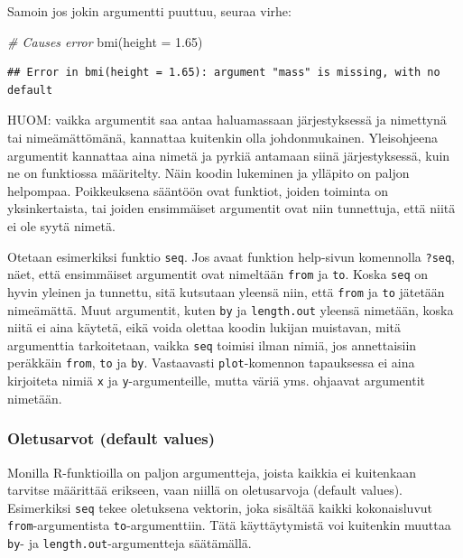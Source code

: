 \documentclass[
]{book}
\newenvironment{Shaded}{\begin{snugshade}}{\end{snugshade}}
\newcommand{\AttributeTok}[1]{\textcolor[rgb]{0.77,0.63,0.00}{#1}}
\newcommand{\CommentTok}[1]{\textcolor[rgb]{0.56,0.35,0.01}{\textit{#1}}}
\newcommand{\FloatTok}[1]{\textcolor[rgb]{0.00,0.00,0.81}{#1}}
\newcommand{\FunctionTok}[1]{\textcolor[rgb]{0.00,0.00,0.00}{#1}}
\newcommand{\NormalTok}[1]{#1}
\begin{document}
Samoin jos jokin argumentti puuttuu, seuraa virhe:

\begin{Shaded}
\begin{Highlighting}[]
\CommentTok{\# Causes error}
\FunctionTok{bmi}\NormalTok{(}\AttributeTok{height =} \FloatTok{1.65}\NormalTok{)}
\end{Highlighting}
\end{Shaded}

\begin{verbatim}
## Error in bmi(height = 1.65): argument "mass" is missing, with no default
\end{verbatim}

HUOM: vaikka argumentit saa antaa haluamassaan järjestyksessä ja nimettynä tai nimeämättömänä, kannattaa kuitenkin olla johdonmukainen. Yleisohjeena argumentit kannattaa aina nimetä ja pyrkiä antamaan siinä järjestyksessä, kuin ne on funktiossa määritelty. Näin koodin lukeminen ja ylläpito on paljon helpompaa. Poikkeuksena sääntöön ovat funktiot, joiden toiminta on yksinkertaista, tai joiden ensimmäiset argumentit ovat niin tunnettuja, että niitä ei ole syytä nimetä.

Otetaan esimerkiksi funktio \texttt{seq}. Jos avaat funktion help-sivun komennolla \texttt{?seq}, näet, että ensimmäiset argumentit ovat nimeltään \texttt{from} ja \texttt{to}. Koska \texttt{seq} on hyvin yleinen ja tunnettu, sitä kutsutaan yleensä niin, että \texttt{from} ja \texttt{to} jätetään nimeämättä. Muut argumentit, kuten \texttt{by} ja \texttt{length.out} yleensä nimetään, koska niitä ei aina käytetä, eikä voida olettaa koodin lukijan muistavan, mitä argumenttia tarkoitetaan, vaikka \texttt{seq} toimisi ilman nimiä, jos annettaisiin peräkkäin \texttt{from}, \texttt{to} ja \texttt{by}. Vastaavasti \texttt{plot}-komennon tapauksessa ei aina kirjoiteta nimiä \texttt{x} ja \texttt{y}-argumenteille, mutta väriä yms. ohjaavat argumentit nimetään.

\hypertarget{oletusarvot-default-values}{%
\subsubsection{Oletusarvot (default values)}\label{oletusarvot-default-values}}

Monilla R-funktioilla on paljon argumentteja, joista kaikkia ei kuitenkaan tarvitse määrittää erikseen, vaan niillä on oletusarvoja (default values). Esimerkiksi \texttt{seq} tekee oletuksena vektorin, joka sisältää kaikki kokonaisluvut \texttt{from}-argumentista \texttt{to}-argumenttiin. Tätä käyttäytymistä voi kuitenkin muuttaa \texttt{by}- ja \texttt{length.out}-argumentteja säätämällä.
\end{document}
